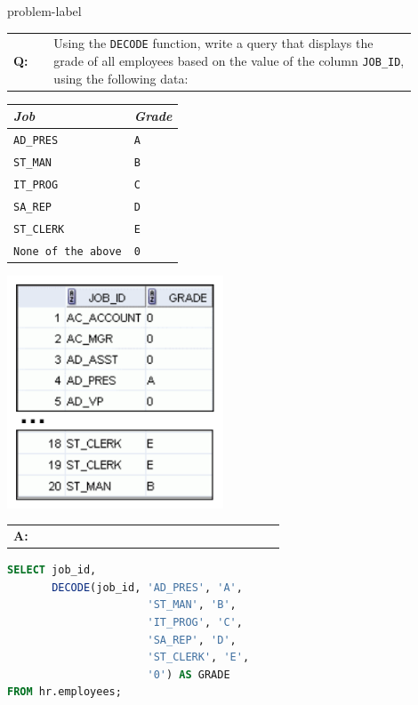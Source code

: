 \begin{problem}{}{problem-label}

\begin{tabular}{@{}l p{0.9\linewidth}@{}}
  \textbf{Q:} & Using the \texttt{DECODE} function, write a query that displays the grade of all employees based on the
value of the column \texttt{JOB\_ID}, using the following data:
\end{tabular}

\begin{center}
\begin{tabular}{|l|l|}
  \hline
  \textbf{\textit{Job}} & \textbf{\textit{Grade}} \\
  \hline
  \texttt{AD\_PRES} & \texttt{A} \\
  \texttt{ST\_MAN} & \texttt{B} \\
  \texttt{IT\_PROG} & \texttt{C} \\
  \texttt{SA\_REP} & \texttt{D} \\
  \texttt{ST\_CLERK} & \texttt{E} \\
  \texttt{None of the above} & \texttt{0} \\
  \hline
\end{tabular}
\end{center}

\begin{center}
  \includegraphics[scale=0.8]{images/c4q5.png}
\end{center}

\begin{tabular}{@{}l p{0.9\linewidth}@{}}
  \textbf{A:} & 
\end{tabular}


\begin{lstlisting}[language=SQL]
SELECT job_id, 
       DECODE(job_id, 'AD_PRES', 'A',
                      'ST_MAN', 'B',
                      'IT_PROG', 'C',
                      'SA_REP', 'D',
                      'ST_CLERK', 'E',
                      '0') AS GRADE
FROM hr.employees;
\end{lstlisting}


\end{problem}
